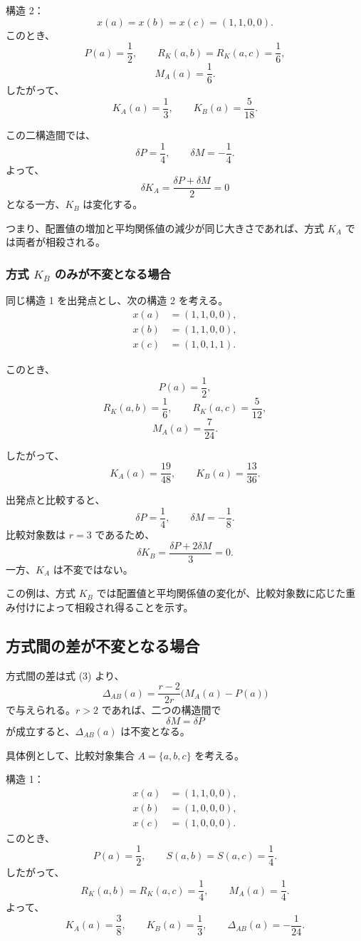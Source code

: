 \documentclass[a4paper,11pt]{ltjsarticle}
\begin{document}
構造 2：
\[
x(a)=x(b)=x(c)=(1,1,0,0).
\]
このとき、
\[
P(a)=\frac12,\qquad
R_K(a,b)=R_K(a,c)=\frac16,
\]
\[
M_A(a)=\frac16.
\]
したがって、
\[
K_A(a)=\frac13,\qquad
K_B(a)=\frac5{18}.
\]

この二構造間では、
\[
\delta P=\frac14,\qquad
\delta M=-\frac14.
\]
よって、
\[
\delta K_A=\frac{\delta P+\delta M}{2}=0
\]
となる一方、$K_B$ は変化する。

つまり、配置値の増加と平均関係値の減少が同じ大きさであれば、方式 $K_A$ では両者が相殺される。

\subsubsection{方式 $K_B$ のみが不変となる場合}

同じ構造 1 を出発点とし、次の構造 2 を考える。
\[
\begin{aligned}
x(a)&=(1,1,0,0),\\
x(b)&=(1,1,0,0),\\
x(c)&=(1,0,1,1).
\end{aligned}
\]

このとき、
\[
P(a)=\frac12,
\]
\[
R_K(a,b)=\frac16,\qquad
R_K(a,c)=\frac5{12},
\]
\[
M_A(a)=\frac7{24}.
\]

したがって、
\[
K_A(a)=\frac{19}{48},\qquad
K_B(a)=\frac{13}{36}.
\]

出発点と比較すると、
\[
\delta P=\frac14,\qquad
\delta M=-\frac18.
\]
比較対象数は $r=3$ であるため、
\[
\delta K_B
=\frac{\delta P+2\delta M}{3}
=0.
\]
一方、$K_A$ は不変ではない。

この例は、方式 $K_B$ では配置値と平均関係値の変化が、比較対象数に応じた重み付けによって相殺され得ることを示す。

\subsection{方式間の差が不変となる場合}

方式間の差は式 (3) より、
\[
\Delta_{AB}(a)=
\frac{r-2}{2r}\bigl(M_A(a)-P(a)\bigr)
\]
で与えられる。$r>2$ であれば、二つの構造間で
\[
\boxed{\delta M=\delta P}
\tag{9}
\]
が成立すると、$\Delta_{AB}(a)$ は不変となる。

具体例として、比較対象集合 $A=\{a,b,c\}$ を考える。

構造 1：
\[
\begin{aligned}
x(a)&=(1,1,0,0),\\
x(b)&=(1,0,0,0),\\
x(c)&=(1,0,0,0).
\end{aligned}
\]
このとき、
\[
P(a)=\frac12,\qquad
S(a,b)=S(a,c)=\frac14.
\]
したがって、
\[
R_K(a,b)=R_K(a,c)=\frac14,
\qquad
M_A(a)=\frac14.
\]
よって、
\[
K_A(a)=\frac38,\qquad
K_B(a)=\frac13,\qquad
\Delta_{AB}(a)=-\frac1{24}.
\]
\end{document}
